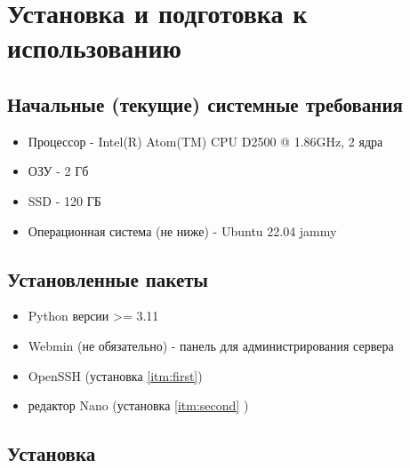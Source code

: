 \section{Установка и подготовка к использованию}
\subsection{Начальные (текущие) системные требования}

\begin{itemize}[label=$\ast$]
	\item	Процессор - Intel(R) Atom(TM) CPU D2500 @ 1.86GHz, 2 ядра
	\item	ОЗУ - 2 Гб 
	\item	SSD - 120 ГБ
	\item	Операционная система (не ниже)  - Ubuntu 22.04 jammy
\end{itemize}	


\subsection{Установленные пакеты}

\begin{itemize}[label=$\ast$]
	\item	Python версии >= 3.11
	\item	Webmin (не обязательно) - панель для администрирования сервера 
	\item	OpenSSH (установка \ref{itm:first})
	\item	редактор Nano (установка \ref{itm:second} )
\end{itemize}	




\subsection{Установка}

